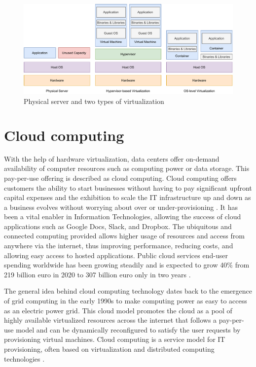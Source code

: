 \begin{figure}[ht]
  \begin{center}
    \includegraphics[width=13.5cm]{images/VirtualizationTypes.pdf}
    \caption{Physical server and two types of virtualization}
    \label{fig:VirtualizationTypes}
  \end{center}
\end{figure}

\section{Cloud computing}

With the help of hardware virtualization, data centers offer on-demand availability of computer resources such as computing power or data storage. This pay-per-use offering is described as cloud computing. Cloud computing offers customers the ability to start businesses without having to pay significant upfront capital expenses and the exhibition to scale the IT infrastructure up and down as a business evolves without worrying about over or under-provisioning \cite{Xing2012}. It has been a vital enabler in Information Technologies, allowing the success of cloud applications such as Google Docs, Slack, and Dropbox. The ubiquitous and connected computing provided allows higher usage of resources and access from anywhere via the internet, thus improving performance, reducing costs, and allowing easy access to hosted applications. Public cloud services end-user spending worldwide has been growing steadily and is expected to grow 40\% from 219 billion euro in 2020 to 307 billion euro only in two years \cite{PublicCloudStatista}.

The general idea behind cloud computing technology dates back to the emergence of grid computing in the early 1990s to make computing power as easy to access as an electric power grid. This cloud model promotes the cloud as a pool of highly available virtualized resources across the internet that follows a pay-per-use model and can be dynamically reconfigured to satisfy the user requests by provisioning virtual machines. Cloud computing is a service model for IT provisioning, often based on virtualization and distributed computing technologies \cite{Lombardi2011}. \cite{Xing2012}

